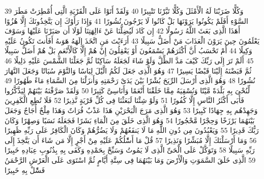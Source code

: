 \documentclass[20pt,a4paper]{article}
\begin{document}
{\tiny\colorbox{cl_aya}{39}} وَكُلًّا ضَرَبْنَا لَهُ الْأَمْثَلَ وَكُلًّا تَبَّرْنَا تَتْبِيرًا
{\tiny\colorbox{cl_aya}{40}} وَلَقَدْ أَتَوْا عَلَى الْقَرْيَةِ الَّتِى أُمْطِرَتْ مَطَرَ السَّوْءِ أَفَلَمْ يَكُونُوا يَرَوْنَهَا بَلْ كَانُوا لَا يَرْجُونَ نُشُورًا
{\tiny\colorbox{cl_aya}{41}} وَإِذَا رَأَوْكَ إِن يَتَّخِذُونَكَ إِلَّا هُزُوًا أَهَذَا الَّذِى بَعَثَ اللَّهُ رَسُولًا
{\tiny\colorbox{cl_aya}{42}} إِن كَادَ لَيُضِلُّنَا عَنْ ءَالِهَتِنَا لَوْلَا أَن صَبَرْنَا عَلَيْهَا وَسَوْفَ يَعْلَمُونَ حِينَ يَرَوْنَ الْعَذَابَ مَنْ أَضَلُّ سَبِيلًا
{\tiny\colorbox{cl_aya}{43}} أَرَءَيْتَ مَنِ اتَّخَذَ إِلَهَهُ هَوَىهُ أَفَأَنتَ تَكُونُ عَلَيْهِ وَكِيلًا
{\tiny\colorbox{cl_aya}{44}} أَمْ تَحْسَبُ أَنَّ أَكْثَرَهُمْ يَسْمَعُونَ أَوْ يَعْقِلُونَ إِنْ هُمْ إِلَّا كَالْأَنْعَمِ بَلْ هُمْ أَضَلُّ سَبِيلًا
{\tiny\colorbox{cl_aya}{45}} أَلَمْ تَرَ إِلَى رَبِّكَ كَيْفَ مَدَّ الظِّلَّ وَلَوْ شَاءَ لَجَعَلَهُ سَاكِنًا ثُمَّ جَعَلْنَا الشَّمْسَ عَلَيْهِ دَلِيلًا
{\tiny\colorbox{cl_aya}{46}} ثُمَّ قَبَضْنَهُ إِلَيْنَا قَبْضًا يَسِيرًا
{\tiny\colorbox{cl_aya}{47}} وَهُوَ الَّذِى جَعَلَ لَكُمُ الَّيْلَ لِبَاسًا وَالنَّوْمَ سُبَاتًا وَجَعَلَ النَّهَارَ نُشُورًا
{\tiny\colorbox{cl_aya}{48}} وَهُوَ الَّذِى أَرْسَلَ الرِّيَحَ بُشْرًا بَيْنَ يَدَىْ رَحْمَتِهِ وَأَنزَلْنَا مِنَ السَّمَاءِ مَاءً طَهُورًا
{\tiny\colorbox{cl_aya}{49}} لِّنُحْىَ بِهِ بَلْدَةً مَّيْتًا وَنُسْقِيَهُ مِمَّا خَلَقْنَا أَنْعَمًا وَأَنَاسِىَّ كَثِيرًا
{\tiny\colorbox{cl_aya}{50}} وَلَقَدْ صَرَّفْنَهُ بَيْنَهُمْ لِيَذَّكَّرُوا فَأَبَى أَكْثَرُ النَّاسِ إِلَّا كُفُورًا
{\tiny\colorbox{cl_aya}{51}} وَلَوْ شِئْنَا لَبَعَثْنَا فِى كُلِّ قَرْيَةٍ نَّذِيرًا
{\tiny\colorbox{cl_aya}{52}} فَلَا تُطِعِ الْكَفِرِينَ وَجَهِدْهُم بِهِ جِهَادًا كَبِيرًا
{\tiny\colorbox{cl_aya}{53}} وَهُوَ الَّذِى مَرَجَ الْبَحْرَيْنِ هَذَا عَذْبٌ فُرَاتٌ وَهَذَا مِلْحٌ أُجَاجٌ وَجَعَلَ بَيْنَهُمَا بَرْزَخًا وَحِجْرًا مَّحْجُورًا
{\tiny\colorbox{cl_aya}{54}} وَهُوَ الَّذِى خَلَقَ مِنَ الْمَاءِ بَشَرًا فَجَعَلَهُ نَسَبًا وَصِهْرًا وَكَانَ رَبُّكَ قَدِيرًا
{\tiny\colorbox{cl_aya}{55}} وَيَعْبُدُونَ مِن دُونِ اللَّهِ مَا لَا يَنفَعُهُمْ وَلَا يَضُرُّهُمْ وَكَانَ الْكَافِرُ عَلَى رَبِّهِ ظَهِيرًا
{\tiny\colorbox{cl_aya}{56}} وَمَا أَرْسَلْنَكَ إِلَّا مُبَشِّرًا وَنَذِيرًا
{\tiny\colorbox{cl_aya}{57}} قُلْ مَا أَسَْٔلُكُمْ عَلَيْهِ مِنْ أَجْرٍ إِلَّا مَن شَاءَ أَن يَتَّخِذَ إِلَى رَبِّهِ سَبِيلًا
{\tiny\colorbox{cl_aya}{58}} وَتَوَكَّلْ عَلَى الْحَىِّ الَّذِى لَا يَمُوتُ وَسَبِّحْ بِحَمْدِهِ وَكَفَى بِهِ بِذُنُوبِ عِبَادِهِ خَبِيرًا
{\tiny\colorbox{cl_aya}{59}} الَّذِى خَلَقَ السَّمَوَتِ وَالْأَرْضَ وَمَا بَيْنَهُمَا فِى سِتَّةِ أَيَّامٍ ثُمَّ اسْتَوَى عَلَى الْعَرْشِ الرَّحْمَنُ فَسَْٔلْ بِهِ خَبِيرًا
\end{document}
